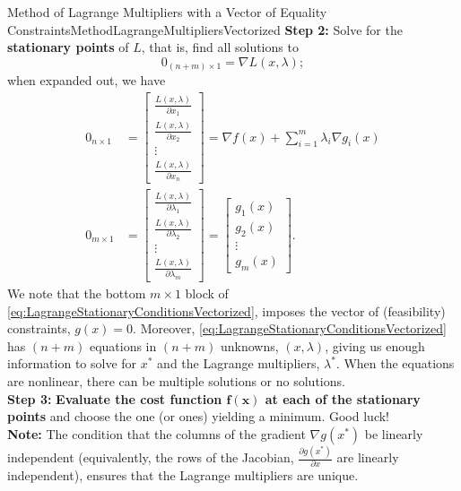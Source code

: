 \begin{methodColor}{Method of Lagrange Multipliers with a Vector of Equality Constraints}{MethodLagrangeMultipliersVectorized}
\textbf{Step 2:} Solve for the \textbf{stationary points} of $L$, that is, find all solutions to
$$0_{(n + m) \times 1} = \nabla L(x, \lambda);$$
when expanded out, we have 
\begin{equation}
\label{eq:LagrangeStationaryConditionsVectorized}
\begin{aligned}
     0_{n \times 1} & =\left[ \begin{array}{c}
         \frac{L(x, \lambda)}{\partial x_1} \\
          \frac{L(x, \lambda)}{\partial x_2} \\
          \vdots \\
           \frac{L(x, \lambda)}{\partial x_n}
    \end{array}\right] = \nabla f(x) +  \sum_{i=1}^m \lambda_i \nabla g_i(x)\\
     0_{m\times 1} & = \left[ \begin{array}{c}
         \frac{L(x, \lambda)}{\partial \lambda_1} \\
          \frac{L(x, \lambda)}{\partial \lambda_2} \\
          \vdots \\
           \frac{L(x, \lambda)}{\partial \lambda_m}
    \end{array}\right] = \left[ \begin{array}{c}
g_1(x) \\ g_2(x) \\ \vdots \\ g_m(x) \end{array} \right].
\end{aligned}
\end{equation}
 We note that the bottom ${m \times 1}$ block of \eqref{eq:LagrangeStationaryConditionsVectorized}, imposes the vector of (feasibility) constraints, $g(x) = 0$. Moreover, \eqref{eq:LagrangeStationaryConditionsVectorized} has $(n+m)$ equations in $(n+m)$ unknowns, $(x, \lambda)$, giving us enough information to solve for $x^\ast$ and the Lagrange multipliers, $\lambda^\ast$. When the equations are nonlinear, there can be multiple solutions or no solutions.\\

\textbf{Step 3:} \textbf{Evaluate the cost function $\bm{f(x)}$ at each of the stationary points} and choose the one (or ones) yielding a minimum. Good luck! \\ 

\textbf{Note:} The condition that the columns of the gradient $\nabla g(x^\ast)$ be linearly independent (equivalently, the rows of the Jacobian, $\frac{ \partial g(x^\ast)}{\partial x} $ are linearly independent), ensures that the Lagrange multipliers are unique. 

\end{methodColor}

